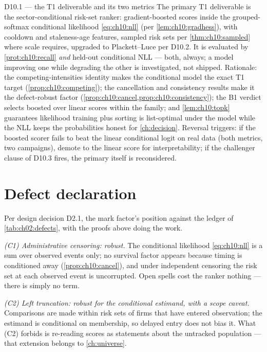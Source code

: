\begin{decision}{D10.1 --- the T1 deliverable and its two metrics}
The primary T1 deliverable is the sector-conditional risk-set ranker:
gradient-boosted scores inside the grouped-softmax conditional likelihood
\cref{eq:ch10:nll} (per \cref{lem:ch10:gradhess}), with cooldown and
staleness-age features, sampled risk sets per \cref{thm:ch10:sampled}
where scale requires, upgraded to Plackett--Luce per D10.2. It is
evaluated by \cref{prot:ch10:recall} \emph{and} held-out conditional NLL
--- both, always; a model improving one while degrading the other is
investigated, not shipped. Rationale: the competing-intensities identity
makes the conditional model the exact T1 target
(\cref{prop:ch10:competing}); the cancellation and consistency results
make it the defect-robust factor (\cref{prop:ch10:cancel,prop:ch10:consistency});
the B1 verdict selects boosted over linear scores within the family; and
\cref{lem:ch10:topk} guarantees likelihood training plus sorting is
list-optimal under the model while the NLL keeps the probabilities
honest for \cref{ch:decision}. Reversal triggers: if the boosted scorer
fails to beat the linear conditional logit on real data (both metrics,
two campaigns), demote to the linear score for interpretability; if the
challenger clause of D10.3 fires, the primary itself is reconsidered.
\end{decision}

\section{Defect declaration}\label{ch10:sec:defects}

Per design decision D2.1, the mark factor's position against the ledger
of \cref{tab:ch02:defects}, with the proofs above doing the work.

\emph{(C1) Administrative censoring: robust.} The conditional likelihood
\cref{eq:ch10:nll} is a sum over observed events only; no survival factor
appears because timing is conditioned away (\cref{prop:ch10:cancel}), and
under independent censoring the risk set at each observed event is
uncorrupted. Open spells cost the ranker nothing --- there is simply no
term.

\emph{(C2) Left truncation: robust for the conditional estimand,
with a scope caveat.} Comparisons are made within risk sets of firms that
have entered observation; the estimand is conditional on membership, so
delayed entry does not bias it. What (C2) forbids is re-reading scores as
statements about the untracked population --- that extension belongs to
\cref{ch:universe}.

